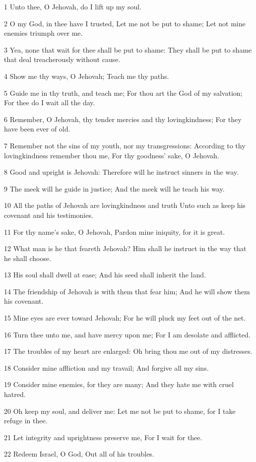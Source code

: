 \par 1 Unto thee, O Jehovah, do I lift up my soul.
\par 2 O my God, in thee have I trusted, Let me not be put to shame; Let not mine enemies triumph over me.
\par 3 Yea, none that wait for thee shall be put to shame: They shall be put to shame that deal treacherously without cause.
\par 4 Show me thy ways, O Jehovah; Teach me thy paths.
\par 5 Guide me in thy truth, and teach me; For thou art the God of my salvation; For thee do I wait all the day.
\par 6 Remember, O Jehovah, thy tender mercies and thy lovingkindness; For they have been ever of old.
\par 7 Remember not the sins of my youth, nor my transgressions: According to thy lovingkindness remember thou me, For thy goodness' sake, O Jehovah.
\par 8 Good and upright is Jehovah: Therefore will he instruct sinners in the way.
\par 9 The meek will he guide in justice; And the meek will he teach his way.
\par 10 All the paths of Jehovah are lovingkindness and truth Unto such as keep his covenant and his testimonies.
\par 11 For thy name's sake, O Jehovah, Pardon mine iniquity, for it is great.
\par 12 What man is he that feareth Jehovah? Him shall he instruct in the way that he shall choose.
\par 13 His soul shall dwell at ease; And his seed shall inherit the land.
\par 14 The friendship of Jehovah is with them that fear him; And he will show them his covenant.
\par 15 Mine eyes are ever toward Jehovah; For he will pluck my feet out of the net.
\par 16 Turn thee unto me, and have mercy upon me; For I am desolate and afflicted.
\par 17 The troubles of my heart are enlarged: Oh bring thou me out of my distresses.
\par 18 Consider mine affliction and my travail; And forgive all my sins.
\par 19 Consider mine enemies, for they are many; And they hate me with cruel hatred.
\par 20 Oh keep my soul, and deliver me: Let me not be put to shame, for I take refuge in thee.
\par 21 Let integrity and uprightness preserve me, For I wait for thee.
\par 22 Redeem Israel, O God, Out all of his troubles.

